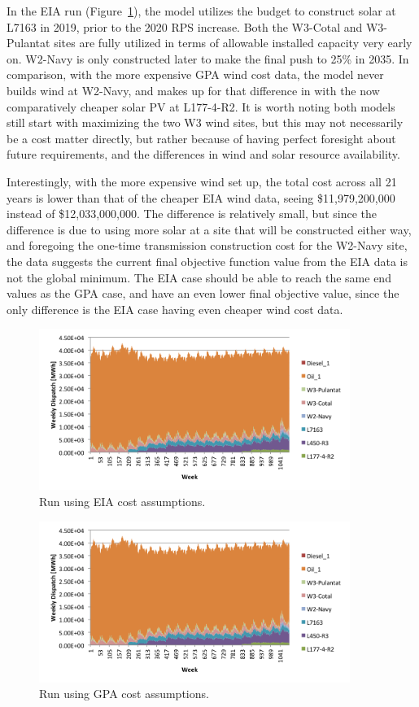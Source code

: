 \documentclass[12pt,letterpaper,fleqn]{article}
\begin{document}
In the EIA run (Figure~\ref{fig:cost_eia}), the model utilizes the
budget to construct solar at L7163 in 2019, prior to the 2020 RPS
increase. Both the W3-Cotal and W3-Pulantat sites are fully utilized
in terms of allowable installed capacity very early on. W2-Navy is
only constructed later to make the final push to 25\% in 2035. In
comparison, with the more expensive GPA wind cost data, the model
never builds wind at W2-Navy, and makes up for that difference in with
the now comparatively cheaper solar PV at L177-4-R2. It is worth
noting both models still start with maximizing the two W3 wind sites,
but this may not necessarily be a cost matter directly, but rather
because of having perfect foresight about future requirements, and the
differences in wind and solar resource availability.

Interestingly, with the more expensive wind set up, the total cost
across all 21 years is lower than that of the cheaper EIA wind data,
seeing \$11,979,200,000 instead of \$12,033,000,000. The difference is
relatively small, but since the difference is due to using more solar
at a site that will be constructed either way, and foregoing the
one-time transmission construction cost for the W2-Navy site, the data
suggests the current final objective function value from the EIA data
is not the global minimum. The EIA case should be able to reach the
same end values as the GPA case, and have an even lower final
objective value, since the only difference is the EIA case having even
cheaper wind cost data.

\begin{figure}[!h]
  \centering
  \includegraphics[width=0.9\textwidth]{img/cost_eia}
  \caption{Run using EIA cost assumptions.}
  \label{fig:cost_eia}
\end{figure}

\begin{figure}[!h]
  \centering
  \includegraphics[width=0.9\textwidth]{img/cost_gpa}
  \caption{Run using GPA cost assumptions.}
  \label{fig:cost_gpa}
\end{figure}
\end{document}
